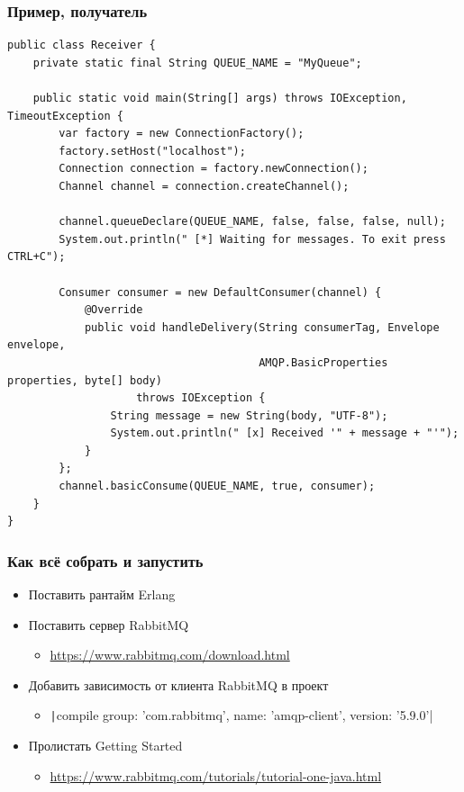 \documentclass[xetex,mathserif,serif]{beamer}
\begin{document}
	\begin{frame}[fragile]
		\frametitle{Пример, получатель}
		\begin{ssmall}
			\begin{verbatim}
public class Receiver {
    private static final String QUEUE_NAME = "MyQueue";

    public static void main(String[] args) throws IOException, TimeoutException {
        var factory = new ConnectionFactory();
        factory.setHost("localhost");
        Connection connection = factory.newConnection();
        Channel channel = connection.createChannel();

        channel.queueDeclare(QUEUE_NAME, false, false, false, null);
        System.out.println(" [*] Waiting for messages. To exit press CTRL+C");

        Consumer consumer = new DefaultConsumer(channel) {
            @Override
            public void handleDelivery(String consumerTag, Envelope envelope,
                                       AMQP.BasicProperties properties, byte[] body)
                    throws IOException {
                String message = new String(body, "UTF-8");
                System.out.println(" [x] Received '" + message + "'");
            }
        };
        channel.basicConsume(QUEUE_NAME, true, consumer);
    }
}
			\end{verbatim}
		\end{ssmall}
	\end{frame}

	\begin{frame}
		\frametitle{Как всё собрать и запустить}
		\begin{itemize}
			\item Поставить рантайм Erlang
			\item Поставить сервер RabbitMQ
			\begin{itemize}
				\item \url{https://www.rabbitmq.com/download.html}
			\end{itemize}
			\item Добавить зависимость от клиента RabbitMQ в проект
			\begin{itemize}
				\item \texttt|compile group: 'com.rabbitmq', name: 'amqp-client', version: '5.9.0'|
			\end{itemize}
			\item Пролистать Getting Started 
			\begin{itemize}
				\item \url{https://www.rabbitmq.com/tutorials/tutorial-one-java.html}
			\end{itemize}
		\end{itemize}
	\end{frame}
\end{document}
